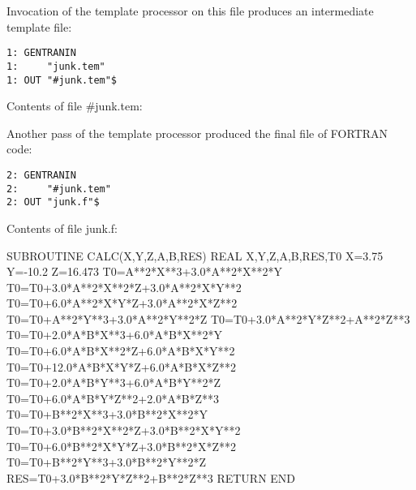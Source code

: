 Invocation of the template processor on this file produces an
intermediate template file:
\begin{verbatim}
1: GENTRANIN 
1:     "junk.tem" 
1: OUT "#junk.tem"$ 
\end{verbatim}
Contents of file \#junk.tem:
Another pass of the template processor produced the final file of FORTRAN
code:
\begin{verbatim}
2: GENTRANIN 
2:     "#junk.tem" 
2: OUT "junk.f"$ 
\end{verbatim}
Contents of file junk.f:
\begin{framedverbatim}
      SUBROUTINE CALC(X,Y,Z,A,B,RES)          
      REAL X,Y,Z,A,B,RES,T0                 
      X=3.75                                  
      Y=-10.2                                 
      Z=16.473                                
      T0=A**2*X**3+3.0*A**2*X**2*Y            
      T0=T0+3.0*A**2*X**2*Z+3.0*A**2*X*Y**2   
      T0=T0+6.0*A**2*X*Y*Z+3.0*A**2*X*Z**2    
      T0=T0+A**2*Y**3+3.0*A**2*Y**2*Z         
      T0=T0+3.0*A**2*Y*Z**2+A**2*Z**3         
      T0=T0+2.0*A*B*X**3+6.0*A*B*X**2*Y       
      T0=T0+6.0*A*B*X**2*Z+6.0*A*B*X*Y**2     
      T0=T0+12.0*A*B*X*Y*Z+6.0*A*B*X*Z**2     
      T0=T0+2.0*A*B*Y**3+6.0*A*B*Y**2*Z       
      T0=T0+6.0*A*B*Y*Z**2+2.0*A*B*Z**3       
      T0=T0+B**2*X**3+3.0*B**2*X**2*Y         
      T0=T0+3.0*B**2*X**2*Z+3.0*B**2*X*Y**2   
      T0=T0+6.0*B**2*X*Y*Z+3.0*B**2*X*Z**2    
      T0=T0+B**2*Y**3+3.0*B**2*Y**2*Z         
      RES=T0+3.0*B**2*Y*Z**2+B**2*Z**3        
      RETURN                                  
      END                                     
\end{framedverbatim} 

